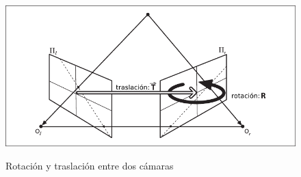 \begin{figure}[bth]
    \myfloatalign
        {\includegraphics[width=1.0\linewidth]{images/epipolarPlaneRelation}}
        \caption{Rotación y traslación entre dos cámaras}
        \label{fig:epipolarPlaneRelation}
\end{figure}


